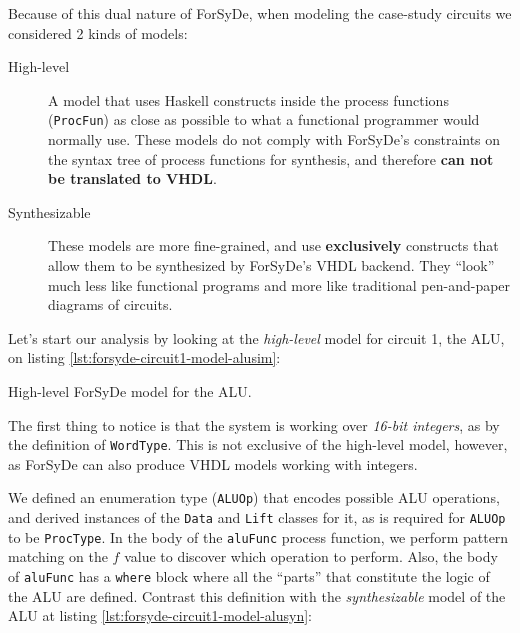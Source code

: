             Because of this dual nature of ForSyDe, when modeling the case-study circuits we
            considered 2 kinds of models:

            \begin{description}
                \item[High-level] A model that uses Haskell constructs inside the process functions
                    (\texttt{ProcFun}) as close as possible to what a functional programmer would
                    normally use. These models do not comply with ForSyDe's constraints on the
                    syntax tree of process functions for synthesis, and therefore \textbf{can
                        not be translated to VHDL}.

                \item[Synthesizable] These models are more fine-grained, and use
                    \textbf{exclusively} constructs that allow them to be synthesized by ForSyDe's
                    VHDL backend. They ``look'' much less like functional programs and more like
                    traditional pen-and-paper diagrams of circuits.
            \end{description}

            Let's start our analysis by looking at the \emph{high-level} model for circuit 1, the
            ALU, on listing \ref{lst:forsyde-circuit1-model-alusim}:

            \begin{listing}[h!]
                \caption{High-level ForSyDe model for the ALU.
                    \label{lst:forsyde-circuit1-model-alusim}}
            \end{listing}

            The first thing to notice is that the system is working over \emph{16-bit integers}, as
            by the definition of \texttt{WordType}. This is not exclusive of the high-level model,
            however, as ForSyDe can also produce VHDL models working with integers.

            We defined an enumeration type (\texttt{ALUOp}) that encodes possible ALU operations,
            and derived instances of the \texttt{Data} and \texttt{Lift} classes for it, as is
            required for \texttt{ALUOp} to be \texttt{ProcType}. In the body of the \texttt{aluFunc}
            process function, we perform pattern matching on the $f$ value to discover which
            operation to perform. Also, the body of \texttt{aluFunc} has a \texttt{where} block
            where all the ``parts'' that constitute the logic of the ALU are defined. Contrast this
            definition with the \emph{synthesizable} model of the ALU at listing
            \ref{lst:forsyde-circuit1-model-alusyn}:

